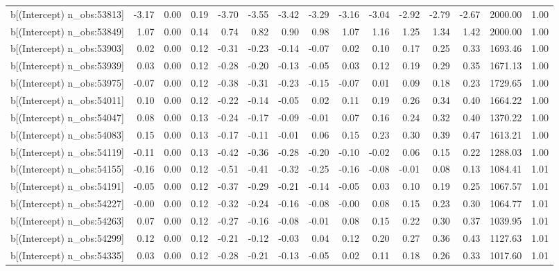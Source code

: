 \begin{table}[ht]
\begin{tabular}{rrrrrrrrrrrrrrr}
  b[(Intercept) n\_obs:53813] & -3.17 & 0.00 & 0.19 & -3.70 & -3.55 & -3.42 & -3.29 & -3.16 & -3.04 & -2.92 & -2.79 & -2.67 & 2000.00 & 1.00 \\ 
  b[(Intercept) n\_obs:53849] & 1.07 & 0.00 & 0.14 & 0.74 & 0.82 & 0.90 & 0.98 & 1.07 & 1.16 & 1.25 & 1.34 & 1.42 & 2000.00 & 1.00 \\ 
  b[(Intercept) n\_obs:53903] & 0.02 & 0.00 & 0.12 & -0.31 & -0.23 & -0.14 & -0.07 & 0.02 & 0.10 & 0.17 & 0.25 & 0.33 & 1693.46 & 1.00 \\ 
  b[(Intercept) n\_obs:53939] & 0.03 & 0.00 & 0.12 & -0.28 & -0.20 & -0.13 & -0.05 & 0.03 & 0.12 & 0.19 & 0.29 & 0.35 & 1671.13 & 1.00 \\ 
  b[(Intercept) n\_obs:53975] & -0.07 & 0.00 & 0.12 & -0.38 & -0.31 & -0.23 & -0.15 & -0.07 & 0.01 & 0.09 & 0.18 & 0.23 & 1729.65 & 1.00 \\ 
  b[(Intercept) n\_obs:54011] & 0.10 & 0.00 & 0.12 & -0.22 & -0.14 & -0.05 & 0.02 & 0.11 & 0.19 & 0.26 & 0.34 & 0.40 & 1664.22 & 1.00 \\ 
  b[(Intercept) n\_obs:54047] & 0.08 & 0.00 & 0.13 & -0.24 & -0.17 & -0.09 & -0.01 & 0.07 & 0.16 & 0.24 & 0.32 & 0.40 & 1370.22 & 1.00 \\ 
  b[(Intercept) n\_obs:54083] & 0.15 & 0.00 & 0.13 & -0.17 & -0.11 & -0.01 & 0.06 & 0.15 & 0.23 & 0.30 & 0.39 & 0.47 & 1613.21 & 1.00 \\ 
  b[(Intercept) n\_obs:54119] & -0.11 & 0.00 & 0.13 & -0.42 & -0.36 & -0.28 & -0.20 & -0.10 & -0.02 & 0.06 & 0.15 & 0.22 & 1288.03 & 1.00 \\ 
  b[(Intercept) n\_obs:54155] & -0.16 & 0.00 & 0.12 & -0.51 & -0.41 & -0.32 & -0.25 & -0.16 & -0.08 & -0.01 & 0.08 & 0.13 & 1084.41 & 1.01 \\ 
  b[(Intercept) n\_obs:54191] & -0.05 & 0.00 & 0.12 & -0.37 & -0.29 & -0.21 & -0.14 & -0.05 & 0.03 & 0.10 & 0.19 & 0.25 & 1067.57 & 1.01 \\ 
  b[(Intercept) n\_obs:54227] & -0.00 & 0.00 & 0.12 & -0.32 & -0.24 & -0.16 & -0.08 & -0.00 & 0.08 & 0.15 & 0.23 & 0.30 & 1064.77 & 1.01 \\ 
  b[(Intercept) n\_obs:54263] & 0.07 & 0.00 & 0.12 & -0.27 & -0.16 & -0.08 & -0.01 & 0.08 & 0.15 & 0.22 & 0.30 & 0.37 & 1039.95 & 1.01 \\ 
  b[(Intercept) n\_obs:54299] & 0.12 & 0.00 & 0.12 & -0.21 & -0.12 & -0.03 & 0.04 & 0.12 & 0.20 & 0.27 & 0.36 & 0.43 & 1127.63 & 1.01 \\ 
  b[(Intercept) n\_obs:54335] & 0.03 & 0.00 & 0.12 & -0.28 & -0.21 & -0.13 & -0.05 & 0.02 & 0.11 & 0.18 & 0.26 & 0.33 & 1017.60 & 1.01 \\ 

\end{tabular}
\end{table}

